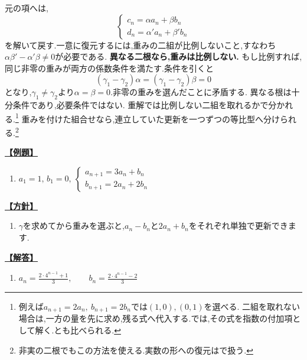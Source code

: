     元の項へは,
    \[
      \begin{cases}
        c_n=\alpha a_n+\beta b_n\\
        d_n=\alpha'a_n+\beta'b_n
      \end{cases}
    \]
    を解いて戻す.一意に復元するには,重みの二組が比例しないこと,すなわち$\alpha\beta'-\alpha'\beta\ne0$が必要である.
    \textbf{異なる二根なら,重みは比例しない.}
    もし比例すれば,同じ非零の重みが両方の係数条件を満たす.条件を引くと
    \[
      (\gamma_1-\gamma_2)\alpha=(\gamma_1-\gamma_2)\beta=0
    \]
    となり,$\gamma_1\ne\gamma_2$より$\alpha=\beta=0$.非零の重みを選んだことに矛盾する.
    異なる根は十分条件であり,必要条件ではない.
    重解では比例しない二組を取れるかで分かれる.\footnote{例えば$a_{n+1}=2a_n,\ b_{n+1}=2b_n$では$(1,0),(0,1)$を選べる.
    二組を取れない場合は,一方の量を先に求め,残る式へ代入する.では,その式を指数の付加項として解く.とも比べられる.}
    重みを付けた組合せなら,連立していた更新を一つずつの等比型へ分けられる.\footnote{非実の二根でもこの方法を使える.実数の形への復元はで扱う.}

    \noindent \hyperlink{book:example-system-1:answer:2}{\textbf{【例題】}}\par\nobreak
    \begin{enumerate}[start=2,label=(\arabic*),parsep=3pt,format=\bookitemlink{example-system-1}{problem}{answer}]
      \item $\displaystyle a_1=1,\,b_1=0,\ \begin{cases}a_{n+1}=3a_n+b_n\\ b_{n+1}=2a_n+2b_n\end{cases}$
    \end{enumerate}

    \noindent \hyperlink{book:example-system-1:problem:2}{\textbf{【方針】}}\par\nobreak
    \begin{enumerate}[start=2,label=(\arabic*),parsep=3pt,format=\bookitemlink{example-system-1}{hint}{problem}]
      \item $\gamma$を求めてから重みを選ぶと,$a_n-b_n$と$2a_n+b_n$をそれぞれ単独で更新できます.
    \end{enumerate}

    \noindent \hyperlink{book:example-system-1:problem:2}{\textbf{【解答】}}\par\nobreak
    \begin{enumerate}[start=2,label=(\arabic*),parsep=3pt,format=\bookitemlink{example-system-1}{answer}{problem}]
      \item $\displaystyle a_n=\frac{2\cdot4^{n-1}+1}{3},\qquad b_n=\frac{2\cdot4^{n-1}-2}{3}$
    \end{enumerate}

